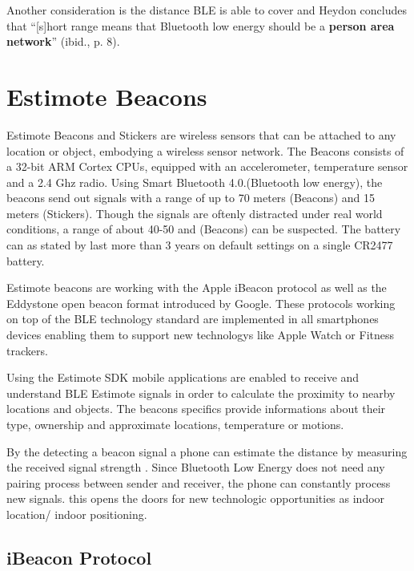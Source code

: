 Another consideration is the distance BLE is able to cover and Heydon concludes that \enquote{[s]hort range means that Bluetooth low energy should be a \textbf{person area network}} (ibid., p. 8).


\vspace{0.5cm}

\section{Estimote Beacons}

Estimote Beacons and Stickers are wireless sensors that can be attached to any location or object, embodying a wireless sensor network. The Beacons consists of a 32-bit ARM Cortex CPUs, equipped with an accelerometer, temperature sensor and a 2.4 Ghz radio. Using Smart Bluetooth 4.0.(Bluetooth low energy), the beacons send out signals with a range of up to 70 meters (Beacons) and 15 meters (Stickers). Though the signals are oftenly distracted under real world conditions, a range of about 40-50 and (Beacons) can be suspected. The battery can as stated by \cite{developerDocsEstimote} last more than 3 years on default settings on a single CR2477 battery.

Estimote beacons are working with the Apple iBeacon protocol as well as the Eddystone  open beacon format introduced by Google. These protocols working on top of the BLE technology standard are implemented in all smartphones devices enabling them to support new technologys like Apple Watch or Fitness trackers.

Using the Estimote SDK \cite{developerDocsEstimote} mobile applications are enabled to receive and understand BLE Estimote signals in order to calculate the proximity to nearby locations and objects. The beacons specifics provide informations about their type, ownership and approximate locations, temperature or motions.

By the detecting a beacon signal a phone can estimate the distance by measuring the received signal strength \cite{developerDocsEstimote}. Since Bluetooth Low Energy does not need any pairing process between sender and receiver, the phone can constantly process new signals. this opens the doors for new technologic opportunities as indoor location/ indoor positioning.


\subsection{iBeacon Protocol}

